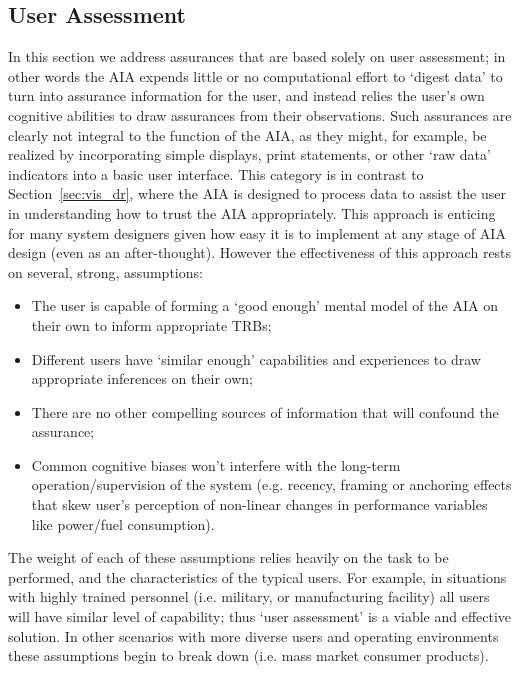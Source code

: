 \subsection{User Assessment} \label{sec:user_assessment}
In this section we address assurances that are based solely on user assessment; in other words the AIA expends little or no computational effort to `digest data' to turn into assurance information for the user, and instead relies the user's own cognitive abilities to draw assurances from their observations. Such assurances are clearly not integral to the function of the AIA, as they might, for example, be realized by incorporating simple displays, print statements, or other `raw data' indicators into a basic user interface. 
This category is in contrast to Section~\ref{sec:vis_dr}, where the AIA is designed to process data to assist the user in understanding how to trust the AIA appropriately. This approach is enticing for many system designers given how easy it is to implement at any stage of AIA design (even as an after-thought). However the effectiveness of this approach rests on several, strong, assumptions:

\begin{itemize}
    \item The user is capable of forming a `good enough' mental model of the AIA on their own to inform appropriate TRBs;
    \item Different users have `similar enough' capabilities and experiences to draw appropriate inferences on their own;
    \item There are no other compelling sources of information that will confound the assurance;
    \item Common cognitive biases won't interfere with the long-term operation/supervision of the system (e.g. recency, framing or anchoring effects that skew user's perception of non-linear changes in performance variables like power/fuel consumption). 
\end{itemize}

The weight of each of these assumptions relies heavily on the task to be performed, and the characteristics of the typical users. For example, in situations with highly trained personnel (i.e. military, or manufacturing facility) all users will have similar level of capability; thus `user assessment' is a viable and effective solution. 
In other scenarios with more diverse users and operating environments these assumptions begin to break down (i.e. mass market consumer products).

